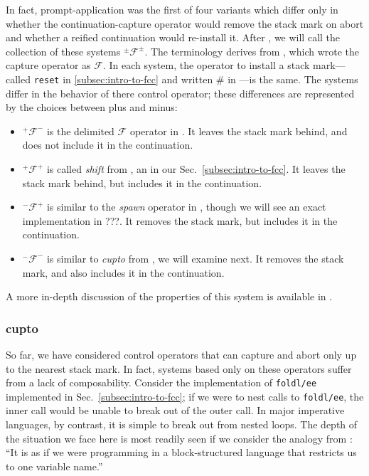 \documentclass[11pt]{article}
\newcommand{\maybePage}{\newpage}
\newcommand\F{\mathcal{F}}
\newcommand\pmFpm{^\pm\F^\pm}
\begin{document}
In fact, prompt-application was the first of four variants which differ only in whether the continuation-capture operator would remove the stack mark on abort and whether a reified continuation would re-install it.
After \cite{MFDC}, we will call the collection of these systems $\pmFpm$.
The terminology derives from \cite{PromptApplication}, which wrote the capture operator as $\mathcal{F}$.
In each system, the operator to install a stack mark---called \texttt{reset} in \ref{subsec:intro-to-fcc} and written $\#$ in \cite{PromptApplication}---is the same.
The systems differ in the behavior of there control operator; these differences are represented by the choices between plus and minus:
\begin{itemize}
\item $^+\mathcal{F}^-$ is the delimited $\mathcal{F}$ operator in \cite{PromptApplication}. It leaves the stack mark behind, and does not include it in the continuation.
\item $^+\mathcal{F}^+$ is called \emph{shift} from \cite{AbstractingControl}, an in our Sec.~\ref{subsec:intro-to-fcc}. It leaves the stack mark behind, but includes it in the continuation.

\item $^-\mathcal{F}^+$ is similar to the \emph{spawn} operator in \cite{ContinuationsAndConcurrency}, though we will see an exact implementation in ???. It removes the stack mark, but includes it in the continuation.
\item $^-\mathcal{F}^-$ is similar to \emph{cupto} from \cite{Gunter:1995}, we will examine next. It removes the stack mark, and also includes it in the continuation.
\end{itemize}
A more in-depth discussion of the properties of this system is available in \cite{MFDC}.

\maybePage
\subsubsection{cupto}
\label{subsec:cupto}

So far, we have considered control operators that can capture and abort only up to the nearest stack mark.
In fact, systems based only on these operators suffer from a lack of composability.
Consider the implementation of \texttt{foldl/ee} implemented in Sec.~\ref{subsec:intro-to-fcc}; if we were to nest calls to \texttt{foldl/ee}, the inner call would be unable to break out of the outer call.
In major imperative languages, by contrast, it is simple to break out from nested loops.
The depth of the situation we face here is most readily seen if we consider the analogy from \cite{ContinuationsAndConcurrency}: ``It is as if we were programming in a block-structured language that restricts us to one variable name.''
\end{document}
